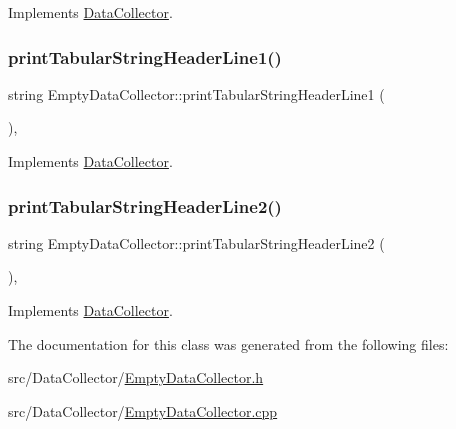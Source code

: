 Implements \mbox{\hyperlink{classDataCollector_a397fccabe0223267eea8fc7cac0e59da}{Data\+Collector}}.

\mbox{\label{classEmptyDataCollector_afa47b48abb2ed59c16f1253e55f93cf2}} 
\subsubsection{\texorpdfstring{print\+Tabular\+String\+Header\+Line1()}{printTabularStringHeaderLine1()}}
{\footnotesize\ttfamily string Empty\+Data\+Collector\+::print\+Tabular\+String\+Header\+Line1 (\begin{DoxyParamCaption}{ }\end{DoxyParamCaption})\hspace{0.3cm}{\ttfamily [override]}, {\ttfamily [virtual]}}



Implements \mbox{\hyperlink{classDataCollector_a91619cfa9e9b8cefd2f7c20d5718b41e}{Data\+Collector}}.

\mbox{\label{classEmptyDataCollector_aa71282121251d344d674223409445be9}} 
\subsubsection{\texorpdfstring{print\+Tabular\+String\+Header\+Line2()}{printTabularStringHeaderLine2()}}
{\footnotesize\ttfamily string Empty\+Data\+Collector\+::print\+Tabular\+String\+Header\+Line2 (\begin{DoxyParamCaption}{ }\end{DoxyParamCaption})\hspace{0.3cm}{\ttfamily [override]}, {\ttfamily [virtual]}}



Implements \mbox{\hyperlink{classDataCollector_af01ea961314be2164f39e6d4cd59e443}{Data\+Collector}}.



The documentation for this class was generated from the following files\+:\begin{DoxyCompactItemize}
\item 
src/\+Data\+Collector/\mbox{\hyperlink{EmptyDataCollector_8h}{Empty\+Data\+Collector.\+h}}\item 
src/\+Data\+Collector/\mbox{\hyperlink{EmptyDataCollector_8cpp}{Empty\+Data\+Collector.\+cpp}}\end{DoxyCompactItemize}
